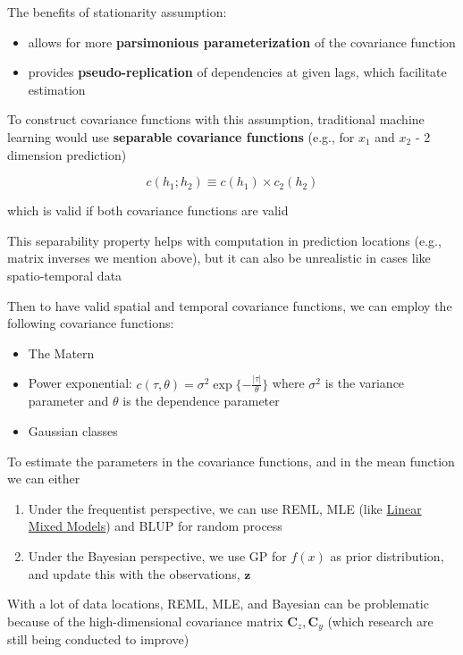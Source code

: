 \documentclass[
]{book}
\providecommand{\tightlist}{%
  \setlength{\itemsep}{0pt}\setlength{\parskip}{0pt}}
\begin{document}
The benefits of stationarity assumption:

\begin{itemize}
\item
  allows for more \textbf{parsimonious parameterization} of the covariance function
\item
  provides \textbf{pseudo-replication} of dependencies at given lags, which facilitate estimation
\end{itemize}

To construct covariance functions with this assumption, traditional machine learning would use \textbf{separable covariance functions} (e.g., for \(x_1\) and \(x_2\) - 2 dimension prediction)

\[
c(h_1;h_2) \equiv c(h_1) \times c_2(h_2)
\]

which is valid if both covariance functions are valid

This separability property helps with computation in prediction locations (e.g., matrix inverses we mention above), but it can also be unrealistic in cases like spatio-temporal data

Then to have valid spatial and temporal covariance functions, we can employ the following covariance functions:

\begin{itemize}
\item
  The Matern
\item
  Power exponential: \(c(\tau, \theta) = \sigma^2 \exp \{ - \frac{|\tau|}{\theta} \}\) where \(\sigma^2\) is the variance parameter and \(\theta\) is the dependence parameter
\item
  Gaussian classes
\end{itemize}

To estimate the parameters in the covariance functions, and in the mean function we can either

\begin{enumerate}
\def\labelenumi{\arabic{enumi}.}
\tightlist
\item
  Under the frequentist perspective, we can use REML, MLE (like \href{https://bookdown.org/mike/data_analysis/linear-mixed-models.html}{Linear Mixed Models}) and BLUP for random process
\item
  Under the Bayesian perspective, we use GP for \(f(x)\) as prior distribution, and update this with the observations, \(\mathbf{z}\)
\end{enumerate}

With a lot of data locations, REML, MLE, and Bayesian can be problematic because of the high-dimensional covariance matrix \(\mathbf{C}_z, \mathbf{C}_y\) (which research are still being conducted to improve)
\end{document}
